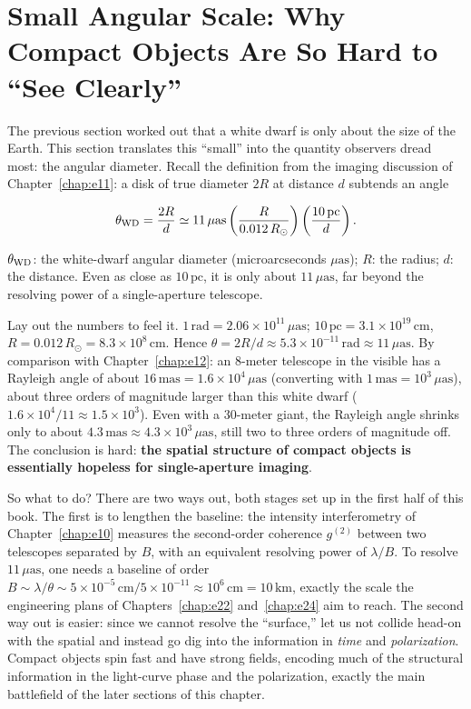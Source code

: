 \section{Small Angular Scale: Why Compact Objects Are So Hard to ``See Clearly''}
\label{sec:e18-angsize}

The previous section worked out that a white dwarf is only about the size of the Earth. This section translates this ``small'' into the quantity observers dread most: the angular diameter. Recall the definition from the imaging discussion of Chapter~\ref{chap:e11}: a disk of true diameter \(2R\) at distance \(d\) subtends an angle

\begin{equation}
  \theta_{\rm WD}=\frac{2R}{d}
  \simeq 11\,\mu\mathrm{as}
  \left(\frac{R}{0.012\,R_\odot}\right)
  \left(\frac{10\,\mathrm{pc}}{d}\right).
  \label{eq:e18-theta}
\end{equation}
\begin{formulaexplain}
\(\theta_{\rm WD}\): the white-dwarf angular diameter (microarcseconds \(\mu\mathrm{as}\)); \(R\): the radius; \(d\): the distance. Even as close as \(10\,\mathrm{pc}\), it is only about \(11\,\mu\mathrm{as}\), far beyond the resolving power of a single-aperture telescope.
\end{formulaexplain}

Lay out the numbers to feel it. \(1\,\mathrm{rad}=2.06\times10^{11}\,\mu\mathrm{as}\); \(10\,\mathrm{pc}=3.1\times10^{19}\,\mathrm{cm}\), \(R=0.012\,R_\odot=8.3\times10^8\,\mathrm{cm}\). Hence \(\theta=2R/d\approx5.3\times10^{-11}\,\mathrm{rad}\approx11\,\mu\mathrm{as}\). By comparison with Chapter~\ref{chap:e12}: an 8-meter telescope in the visible has a Rayleigh angle of about \(16\,\mathrm{mas}=1.6\times10^4\,\mu\mathrm{as}\) (converting with \(1\,\mathrm{mas}=10^3\,\mu\mathrm{as}\)), about three orders of magnitude larger than this white dwarf (\(1.6\times10^4/11\approx1.5\times10^3\)). Even with a 30-meter giant, the Rayleigh angle shrinks only to about \(4.3\,\mathrm{mas}\approx4.3\times10^3\,\mu\mathrm{as}\), still two to three orders of magnitude off. The conclusion is hard: \textbf{the spatial structure of compact objects is essentially hopeless for single-aperture imaging}.

So what to do? There are two ways out, both stages set up in the first half of this book. The first is to lengthen the baseline: the intensity interferometry of Chapter~\ref{chap:e10} measures the second-order coherence \(g^{(2)}\) between two telescopes separated by \(B\), with an equivalent resolving power of \(\lambda/B\). To resolve \(11\,\mu\mathrm{as}\), one needs a baseline of order \(B\sim\lambda/\theta\sim5\times10^{-5}\,\mathrm{cm}/5\times10^{-11}\approx10^6\,\mathrm{cm}=10\,\mathrm{km}\), exactly the scale the engineering plans of Chapters~\ref{chap:e22} and~\ref{chap:e24} aim to reach. The second way out is easier: since we cannot resolve the ``surface,'' let us not collide head-on with the spatial and instead go dig into the information in \emph{time} and \emph{polarization}. Compact objects spin fast and have strong fields, encoding much of the structural information in the light-curve phase and the polarization, exactly the main battlefield of the later sections of this chapter.

